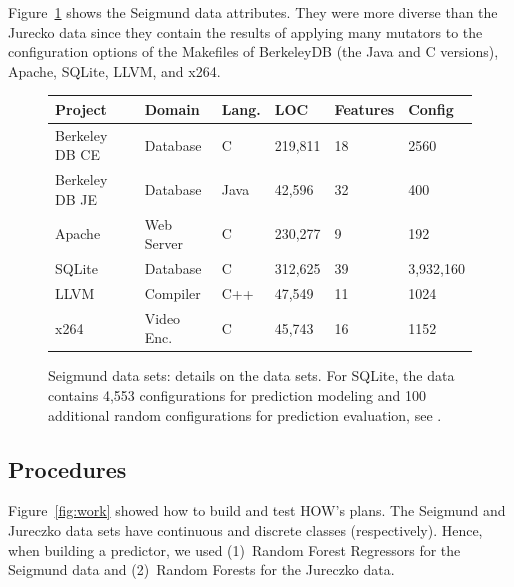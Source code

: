 \documentclass[conference]{IEEEtran}
\newcommand{\fig}[1]{Figure~\ref{fig:#1}}
\begin{document}
   \fig{cpm} shows the  Seigmund data attributes.
   They were more diverse than the 
    Jurecko data since they
   contain the results of applying many  mutators
  to the configuration options of the Makefiles of  BerkeleyDB (the Java  and  C versions),  Apache,  SQLite,  LLVM, and x264.  


 

\begin{figure}[!t]
\scriptsize
\begin{tabular}{llllll}
  \hline
  \rowcolor{lightgray}
Project & Domain & Lang. & LOC & Features & Config\\\hline
Berkeley DB CE & Database & C & 219,811 & 18 & 2560\\
Berkeley DB JE & Database & Java & 42,596 & 32  & 400\\
Apache & Web Server & C & 230,277 & 9 & 192\\
SQLite & Database & C & 312,625 & 39 & 3,932,160\\
LLVM & Compiler & C++ & 47,549 & 11 & 1024\\
x264 & Video Enc. & C& 45,743 & 16 & 1152\\\hline
\end{tabular}
 
\caption{Seigmund data sets: details on the data sets.
For SQLite, the data  contains 4,553 configurations for prediction modeling and 100 additional random configurations for prediction evaluation, see \cite{vapp}.}\label{fig:cpm}
\end{figure}





   \subsection{Procedures}
  \fig{work} showed how to   build and test HOW's plans.
The    Seigmund and Jureczko data sets have continuous and discrete classes (respectively).
Hence, when building a predictor, we used (1)~Random Forest Regressors for the Seigmund data and (2)~Random Forests
for the Jureczko data.
\end{document}
